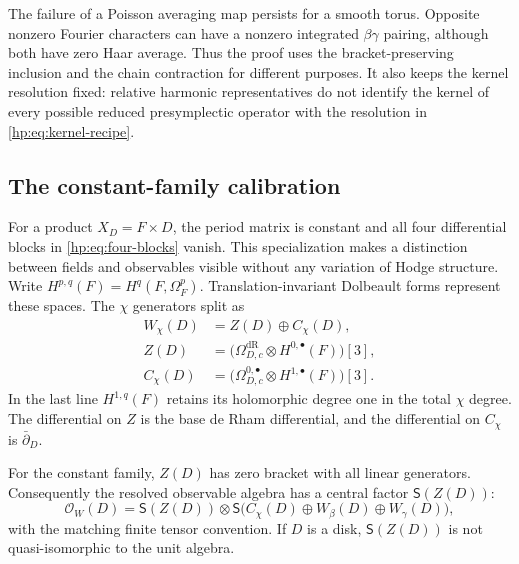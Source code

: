 The failure of a Poisson averaging map persists for a smooth
torus. Opposite nonzero Fourier characters can have a nonzero
integrated $\beta\gamma$ pairing, although both have zero Haar
average. Thus the proof uses the bracket-preserving inclusion
and the chain contraction for different purposes. It also keeps
the kernel resolution fixed: relative harmonic representatives
do not identify the kernel of every possible reduced
presymplectic operator with the resolution in
\eqref{hp:eq:kernel-recipe}.

\subsection{The constant-family calibration}
\label{hp:subsec:constant}

For a product $X_D=F\times D$, the period matrix is constant and
all four differential blocks in \eqref{hp:eq:four-blocks} vanish. This
specialization makes a distinction between fields and observables
visible without any variation of Hodge structure.
Write $H^{p,q}(F)=H^q(F,\Omega_F^p)$. Translation-invariant
Dolbeault forms represent these spaces. The $\chi$ generators
split as
\begin{equation}\label{hp:eq:constant-split}
\begin{aligned}
 W_\chi(D)&=Z(D)\oplus C_\chi(D),\\
 Z(D)&=\bigl(\Omega^{\mathrm{dR}}_{D,c}
                         \otimes H^{0,\bullet}(F)\bigr)[3],\\
 C_\chi(D)&=\bigl(\Omega^{0,\bullet}_{D,c}
                         \otimes H^{1,\bullet}(F)\bigr)[3].
\end{aligned}
\end{equation}
In the last line $H^{1,q}(F)$ retains its holomorphic degree one
in the total $\chi$ degree. The differential on $Z$ is the base
de Rham differential, and the differential on $C_\chi$ is
$\bar\partial_D$.

\begin{proposition}
\label{hp:prop:central}
For the constant family, $Z(D)$ has zero bracket with all linear
generators. Consequently the resolved observable algebra has a
central factor $\mathsf S(Z(D))$:
\begin{equation}\label{hp:eq:central-factor}
 \mathcal O_W(D)=\mathsf S(Z(D))\otimes
                 \mathsf S\bigl(C_\chi(D)\oplus
                                W_\beta(D)\oplus W_\gamma(D)\bigr),
\end{equation}
with the matching finite tensor convention. If $D$ is a disk,
$\mathsf S(Z(D))$ is not quasi-isomorphic to the unit algebra.
\end{proposition}

